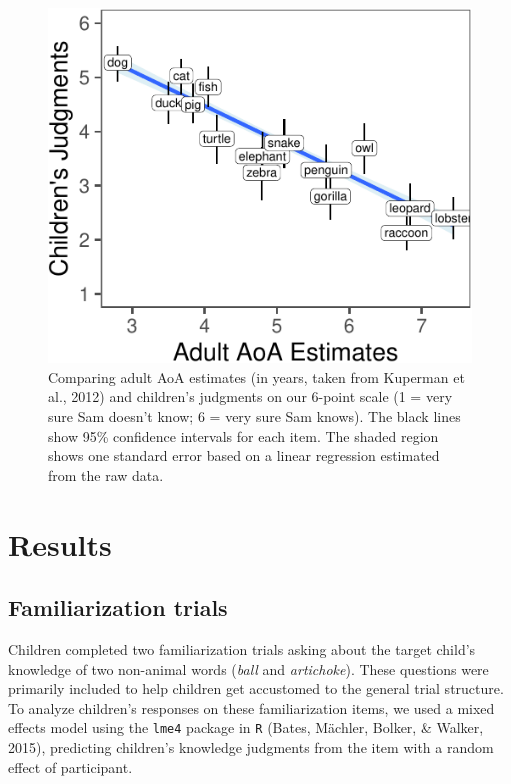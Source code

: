 \documentclass[10pt, letterpaper]{article}
\newenvironment{CodeChunk}{}{}
\begin{document}
\begin{CodeChunk}
\begin{figure}[tb]
\includegraphics{figs/overall-1} \caption[Comparing adult AoA estimates (in years, taken from Kuperman et al., 2012) and children’s judgments on our 6-point scale (1 = very sure Sam doesn’t know]{Comparing adult AoA estimates (in years, taken from Kuperman et al., 2012) and children’s judgments on our 6-point scale (1 = very sure Sam doesn’t know; 6 = very sure Sam knows). The black lines show 95\% confidence intervals for each item. The shaded region shows one standard error based on a linear regression estimated from the raw data.}\label{fig:overall}
\end{figure}
\end{CodeChunk}

\hypertarget{results}{%
\section{Results}\label{results}}

\hypertarget{familiarization-trials}{%
\subsection{Familiarization trials}\label{familiarization-trials}}

Children completed two familiarization trials asking about the target
child's knowledge of two non-animal words (\emph{ball} and
\emph{artichoke}). These questions were primarily included to help
children get accustomed to the general trial structure. To analyze
children's responses on these familiarization items, we used a mixed
effects model using the \texttt{lme4} package in \texttt{R} (Bates,
Mächler, Bolker, \& Walker, 2015), predicting children's knowledge
judgments from the item with a random effect of participant.
\end{document}
